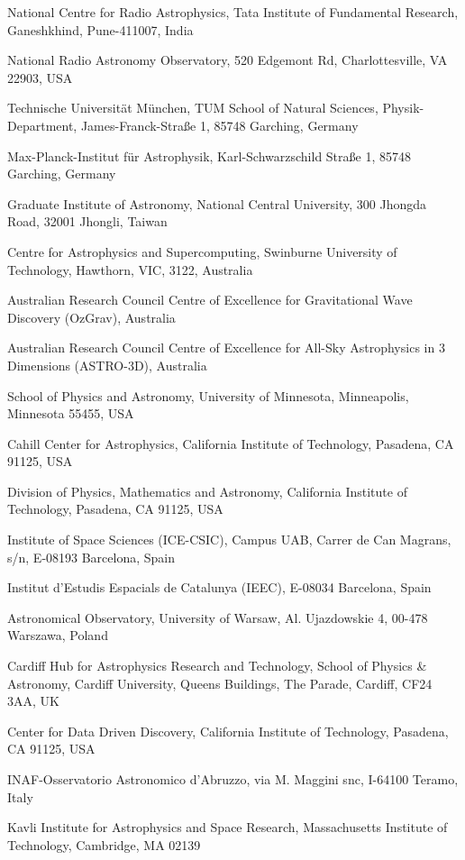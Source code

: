 \documentclass{nature_plusfigure}
\begin{document}
\begin{small}
\begin{affiliations}
\item National Centre for Radio Astrophysics, Tata Institute of Fundamental Research, Ganeshkhind, Pune-411007, India
\item National Radio Astronomy Observatory, 520 Edgemont Rd, Charlottesville, VA 22903, USA
\item Technische Universit{\"a}t M{\"u}nchen, TUM School of Natural Sciences, Physik-Department, James-Franck-Stra{\ss}e 1, 85748 Garching, Germany
\item Max-Planck-Institut f{\"u}r Astrophysik, Karl-Schwarzschild Stra{\ss}e 1, 85748 Garching, Germany
\item Graduate Institute of Astronomy, National Central University, 300 Jhongda Road, 32001 Jhongli, Taiwan
\item Centre for Astrophysics and Supercomputing, Swinburne University of Technology, Hawthorn, VIC, 3122, Australia
\item Australian Research Council Centre of Excellence for Gravitational Wave Discovery (OzGrav), Australia
\item Australian Research Council Centre of Excellence for All-Sky Astrophysics in 3 Dimensions (ASTRO-3D), Australia
\item School of Physics and Astronomy, University of Minnesota, Minneapolis, Minnesota 55455, USA
\item Cahill Center for Astrophysics, California Institute of Technology, Pasadena, CA 91125, USA
\item Division of Physics, Mathematics and Astronomy, California Institute of Technology, Pasadena, CA 91125, USA
\item Institute of Space Sciences (ICE-CSIC), Campus UAB, Carrer de Can Magrans, s/n, E-08193 Barcelona, Spain
\item Institut d'Estudis Espacials de Catalunya (IEEC), E-08034 Barcelona, Spain
\item Astronomical Observatory, University of Warsaw, Al. Ujazdowskie 4, 00-478 Warszawa, Poland
\item Cardiff Hub for Astrophysics Research and Technology, School of Physics \& Astronomy, Cardiff University, Queens Buildings, The Parade, Cardiff, CF24 3AA, UK
\item Center for Data Driven Discovery, California Institute of Technology, Pasadena, CA 91125, USA
\item INAF-Osservatorio Astronomico d’Abruzzo, via M. Maggini snc, I-64100 Teramo, Italy
\item Kavli Institute for Astrophysics and Space Research, Massachusetts Institute of Technology, Cambridge, MA 02139

\end{affiliations}
\end{small}
\end{document}
